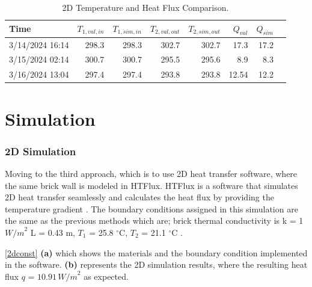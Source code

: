 \begin{table}[tb]
    \caption{2D Temperature and Heat Flux Comparison.}
    \label{table2d}
    \centering
    \begin{tabular}{lrrrrrrr}
        \toprule
        Time                & $T_{1,val,in}$ & $T_{1,sim,in}$ & $T_{2,val,out}$& $T_{2,sim,out}$ & $Q_{val}$ & $Q_{sim}$ \\
        \midrule
        3/14/2024 16:14 & 298.3    & 298.3    & 302.7     & 302.7     & 17.3 & 17.2 \\
        3/15/2024 02:14  & 300.7    & 300.7   & 295.5    & 295.6     & 8.9  & 8.3  \\
        3/16/2024 13:04 & 297.4  & 297.4   & 293.8   & 293.8   & 12.54 & 12.2  \\
        \bottomrule
    \end{tabular}
   
\end{table}

















\section{Simulation}
\subsubsection{2D Simulation}
Moving to the third approach, which is to use 2D heat transfer software, where the same brick wall is modeled in HTFlux. 
HTFlux is a software that simulates 2D heat transfer seamlessly and calculates the heat flux by providing the temperature gradient \cite{HTflux}. 
The boundary conditions assigned in this simulation are the same as the previous methods which are; brick thermal conductivity is k = 1 ${W/m}^2$ L = 0.43 m,
$T_1$ = 25.8 $^\circ \text{C}$, 
$T_2$  = 21.1  $^\circ \text{C}$ .


 \ref{2dconst} \textbf{(a)} which shows the materials and the boundary condition implemented in the software. \textbf{(b)} represents the 2D simulation results, where the resulting heat flux \( q \) = \( 10.91 \, {W/m}^2 \) as expected.










